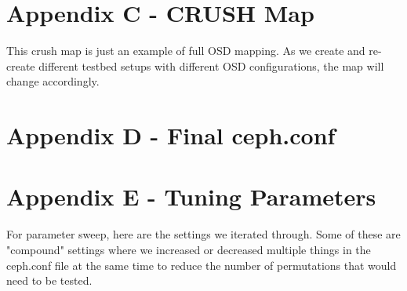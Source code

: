 \documentclass{article}
\begin{document}


\section*{Appendix C - CRUSH Map}

This crush map is just an example of full OSD mapping. As we create and
re-create different testbed setups with different OSD configurations, the map will
change accordingly.




\section*{Appendix D - Final ceph.conf}



\section*{Appendix E - Tuning Parameters}

For parameter sweep, here are the settings we iterated through.  Some of these
are "compound" settings where we increased or decreased multiple things in the
ceph.conf file at the same time to reduce the number of permutations that would
need to be tested.


\end{document}
